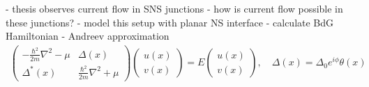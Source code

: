 - thesis observes current flow in SNS junctions
- how is current flow possible in these junctions?
- model this setup with planar NS interface
- calculate BdG Hamiltonian
- Andreev approximation
\begin{eqnarray}
\begin{pmatrix}
-\frac{\hbar^2}{2m} \nabla^2 - \mu & \Delta(x) \\
\Delta^*(x) & \frac{\hbar^2}{2m} \nabla^2 + \mu
\end{pmatrix}
\begin{pmatrix}
u(x) \\
v(x)
\end{pmatrix} = E 
\begin{pmatrix}
u(x)\\
v(x)
\end{pmatrix}, \quad \Delta(x) = \Delta_0 e^{i \phi} \theta(x)
\end{eqnarray}
